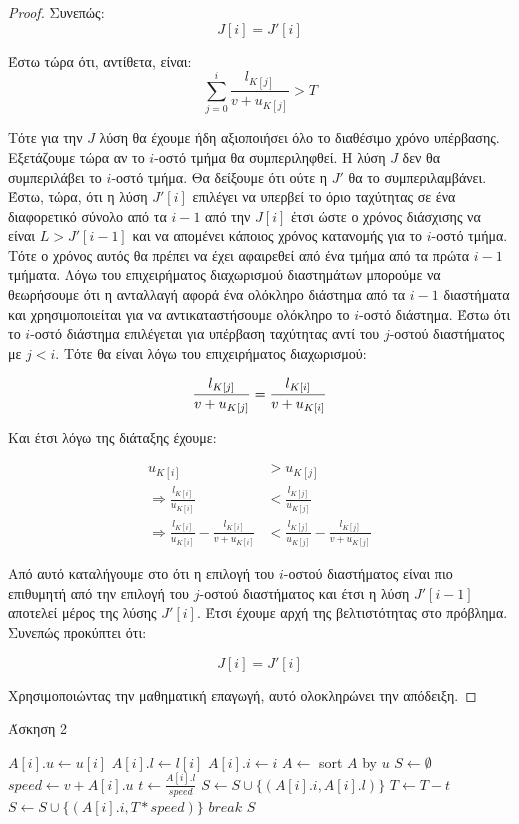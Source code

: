 \documentclass[11pt,a4paper]{book}
\begin{document}
\begin{proof}
Συνεπώς:
\[
J[ i ] = J'[ i ]
\]

Έστω τώρα ότι, αντίθετα, είναι:
\[
\sum_{j=0}^{i} \frac{l_{K[ j ]}}{v + u_{K[ j ]}} > T
\]

Τότε για την $J$ λύση θα έχουμε ήδη αξιοποιήσει όλο το διαθέσιμο χρόνο υπέρβασης. Εξετάζουμε τώρα αν το $i$-οστό τμήμα θα συμπεριληφθεί. Η λύση $J$ δεν θα συμπεριλάβει το $i$-οστό τμήμα. Θα δείξουμε ότι ούτε η $J'$ θα το συμπεριλαμβάνει. Έστω, τώρα, ότι η λύση $J'[ i ]$ επιλέγει να υπερβεί το όριο ταχύτητας σε ένα διαφορετικό σύνολο από τα $i - 1$ από την $J[ i ]$ έτσι ώστε ο χρόνος διάσχισης να είναι $L > J'[ i - 1 ]$ και να απομένει κάποιος χρόνος κατανομής για το $i$-οστό τμήμα. Τότε ο χρόνος αυτός θα πρέπει να έχει αφαιρεθεί από ένα τμήμα από τα πρώτα $i - 1$ τμήματα. Λόγω του επιχειρήματος διαχωρισμού διαστημάτων μπορούμε να θεωρήσουμε ότι η ανταλλαγή αφορά ένα ολόκληρο διάστημα από τα $i - 1$ διαστήματα και χρησιμοποιείται για να αντικαταστήσουμε ολόκληρο το $i$-οστό διάστημα. Έστω ότι το $i$-οστό διάστημα επιλέγεται για υπέρβαση ταχύτητας αντί του $j$-οστού διαστήματος με $j < i$. Τότε θα είναι λόγω του επιχειρήματος διαχωρισμού:

\[
\frac{l_{K[ j ]}}{v + u_{K[ j ]}} = \frac{l_{K[ i ]}}{v + u_{K[ i ]}}\\
\]

Και έτσι λόγω της διάταξης έχουμε:

\begin{align*}
{u_{K[ i ]}} & > {u_{K[ j ]}} \\
\Rightarrow \frac{l_{K[ i ]}}{u_{K[ i ]}} & < \frac{l_{K[ j ]}}{u_{K[ j ]}} \\
\Rightarrow \frac{l_{K[ i ]}}{u_{K[ i ]}} - \frac{l_{K[ i ]}}{v + u_{K[ i ]}} & < \frac{l_{K[ j ]}}{u_{K[ j ]}} - \frac{l_{K[ j ]}}{v + u_{K[ j ]}}
\end{align*}

Από αυτό καταλήγουμε στο ότι η επιλογή του $i$-οστού διαστήματος είναι πιο επιθυμητή από την επιλογή του $j$-οστού διαστήματος και έτσι η λύση $J'[ i - 1 ]$ αποτελεί μέρος της λύσης $J'[ i ]$. Έτσι έχουμε αρχή της βελτιστότητας στο πρόβλημα. Συνεπώς προκύπτει ότι:

\[
J[ i ] = J'[ i ]
\]

Χρησιμοποιώντας την μαθηματική επαγωγή, αυτό ολοκληρώνει την απόδειξη.
\end{proof}

\begin{algorithm}[H]
\caption{\textgreek{Άσκηση 2}}
\begin{algorithmic}[1]
		\State $A[ i ].u \gets u[ i ]$
		\State $A[ i ].l \gets l[ i ]$
		\State $A[ i ].i \gets i$
	\EndFor
	\State $A \gets $ sort $A$ by $u$
	\State $S \gets \emptyset$
		\State $speed \gets v + A[ i ].u$
		\State $t \gets \frac{A[ i ].l}{speed}$
			\State $S \gets S \cup \{ ( A[ i ].i, A[ i ].l ) \}$
			\State $T \gets T - t$
		\Else
			\State $S \gets S \cup \{ ( A[ i ].i, T * speed ) \}$
			\State $break$
		\EndIf
	\EndFor
	\State \Return $S$
\EndProcedure
\end{algorithmic}
\end{algorithm}
\end{document}
